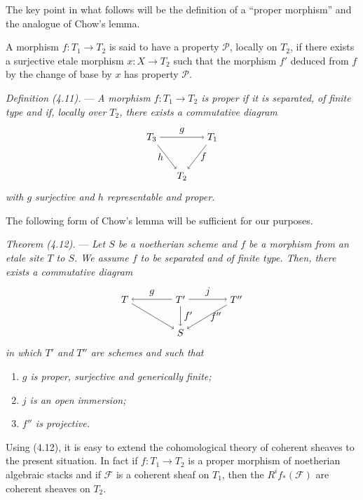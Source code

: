 \documentclass[10pt]{article}
\begin{document}
The key point in what follows will be the definition of a ``proper morphism'' and the analogue of Chow's lemma.

A morphism $f:T_1\to T_2$ is said to have a property $\mathcal P$, locally on $T_2$, if there exists a surjective etale morphism $x:X\to T_2$ such that the morphism $f'$ deduced from $f$ by the change of base by $x$ has property $\mathcal P$.

\medskip
\noindent\emph{Definition (4.11).} --- \emph{A morphism $f:T_1\to T_2$ is proper if it is separated, of finite type and if, locally over $T_2$, there exists a commutative diagram}
\[
\begin{tikzpicture}[baseline=(current bounding box.center)]
\node (T3) at (0,1.4) {$T_3$};
\node (T1) at (2.2,1.4) {$T_1$};
\node (T2) at (1.1,0) {$T_2$};
\draw[->] (T3) -- node[above] {$g$} (T1);
\draw[->] (T1) -- node[right] {$f$} (T2);
\draw[->] (T3) -- node[left] {$h$} (T2);
\end{tikzpicture}
\]
\emph{with $g$ surjective and $h$ representable and proper.}

The following form of Chow's lemma will be sufficient for our purposes.

\medskip
\noindent\emph{Theorem (4.12).} --- \emph{Let $S$ be a noetherian scheme and $f$ be a morphism from an etale site $T$ to $S$. We assume $f$ to be separated and of finite type. Then, there exists a commutative diagram}
\[
\begin{tikzpicture}[baseline=(current bounding box.center)]
\node (T) at (0,1.2) {$T$};
\node (Tp) at (2.0,1.2) {$T'$};
\node (Tpp) at (4.0,1.2) {$T''$};
\node (S) at (2.0,0) {$S$};
\draw[->] (Tp) -- node[above] {$g$} (T);
\draw[->] (Tp) -- node[above] {$j$} (Tpp);
\draw[->] (T) -- (S);
\draw[->] (Tp) -- node[right] {$f'$} (S);
\draw[->] (Tpp) -- node[right] {$f''$} (S);
\end{tikzpicture}
\]
\emph{in which $T'$ and $T''$ are schemes and such that}
\begin{enumerate}[label=(\roman*)]
\item \emph{$g$ is proper, surjective and generically finite;}
\item \emph{$j$ is an open immersion;}
\item \emph{$f''$ is projective.}
\end{enumerate}

Using (4.12), it is easy to extend the cohomological theory of coherent sheaves to the present situation. In fact if $f:T_1\to T_2$ is a proper morphism of noetherian algebraic stacks and if $\mathscr F$ is a coherent sheaf on $T_1$, then the $R^i f_*(\mathscr F)$ are coherent sheaves on $T_2$.
\end{document}
